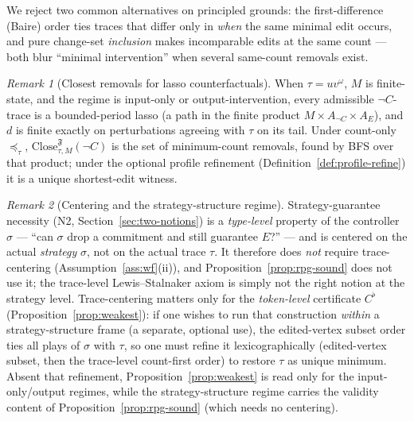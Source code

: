 \documentclass[11pt]{article}
\theoremstyle{remark}
\newtheorem{remark}{Remark}
\newcommand{\Close}{\mathrm{Close}}
\newcommand{\Frame}{\mathfrak{F}}
\begin{document}
We reject two common alternatives on principled grounds: the first-difference
(Baire) order ties traces that differ only in \emph{when} the same minimal edit
occurs, and pure change-set \emph{inclusion} makes incomparable edits at the
same count --- both blur ``minimal intervention'' when several same-count
removals exist.

\begin{remark}[Closest removals for lasso counterfactuals]
\label{rem:lasso-close}
When \(\tau=uv^\omega\), \(M\) is finite-state, and the regime is input-only or
output-intervention, every admissible \(\neg C\)-trace is a bounded-period lasso
(a path in the finite product \(M\times A_{\neg C}\times A_E\)), and \(d\) is
finite exactly on perturbations agreeing with \(\tau\) on its tail. Under
count-only \(\preceq_\tau\), \(\Close_{\tau,M}^{\Frame}(\neg C)\) is the set of
minimum-count removals, found by BFS over that product; under the optional profile
refinement (Definition~\ref{def:profile-refine}) it is a unique shortest-edit
witness.
\end{remark}

\begin{remark}[Centering and the strategy-structure regime]
\label{rem:strat-centering}
Strategy-guarantee necessity (N2, Section~\ref{sec:two-notions}) is a
\emph{type-level} property of the controller \(\sigma\) --- ``can \(\sigma\) drop
a commitment and still guarantee \(E\)?'' --- and is centered on the actual
\emph{strategy} \(\sigma\), not on the actual trace \(\tau\). It therefore does
\emph{not} require trace-centering (Assumption~\ref{ass:wf}(ii)), and
Proposition~\ref{prop:rpg-sound} does not use it; the trace-level
Lewis--Stalnaker axiom is simply not the right notion at the strategy level.
Trace-centering matters only for the \emph{token-level} certificate
\(C^{\flat}\) (Proposition~\ref{prop:weakest}): if one wishes to run that
construction \emph{within} a strategy-structure frame (a separate, optional use),
the edited-vertex subset order ties all plays of \(\sigma\) with \(\tau\), so one
must refine it lexicographically (edited-vertex subset, then the trace-level
count-first order) to restore \(\tau\) as unique minimum. Absent that refinement,
Proposition~\ref{prop:weakest} is read only for the input-only/output regimes,
while the strategy-structure regime carries the validity content of
Proposition~\ref{prop:rpg-sound} (which needs no centering).
\end{remark}
\end{document}
